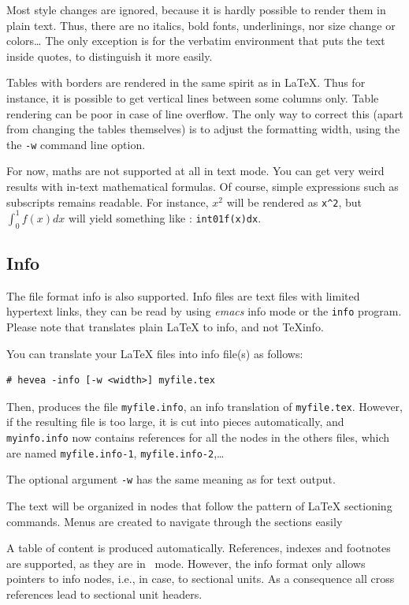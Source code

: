 Most style changes are ignored, because it is hardly
possible to render them in plain text. Thus, there are no italics,
bold fonts, underlinings, nor size change or colors\ldots{}
The only exception is for the verbatim environment
that puts the text inside quotes, to distinguish it more easily.

Tables with borders are rendered in the same spirit as in \LaTeX{}.
Thus for instance, it is possible to get vertical lines between some
columns only.
Table rendering can be poor in case of line overflow.
The only way to correct this (apart from changing the tables
themselves) is to adjust the formatting width, using the
the \texttt{-w} command line option.

For now, maths are not supported at all in text mode. You can get very weird
results with in-text mathematical formulas.
Of course, simple expressions such as subscripts remains readable.
For instance, $x^2$ will be rendered as \verb+x^2+, but $\int_0^1f(x)dx$ will
yield something like : \verb+int01f(x)dx+.


\subsection{Info}
The file format info is also supported.
Info files are text files with limited hypertext links, they
can be read by using \emph{emacs} info mode or the
\texttt{info} program.
Please note that \hevea{} translates plain \LaTeX{} to info, and not
TeXinfo.

You can translate your \LaTeX{} files into info file(s) as follows:
\begin{verbatim}
# hevea -info [-w <width>] myfile.tex
\end{verbatim}
Then, \hevea{} produces the file \texttt{myfile.info}, an info
translation of \texttt{myfile.tex}.
However, if the resulting  file is too large, it is cut into pieces
automatically,
and \texttt{myinfo.info} now contains references for all
the nodes in the others files, which are named \texttt{myfile.info-1},
\texttt{myfile.info-2},\ldots

The optional argument \verb+-w+ has the same meaning as for text output.

The text will be organized in nodes that follow
the pattern of \LaTeX{} sectioning
commands. Menus are created to navigate through the sections easily

A table of content is produced automatically.
References, indexes and footnotes are supported, as they are in
\html{}~mode.
However, the info format only allows pointers to info nodes,
i.e., in \hevea{} case, to sectional units.
As a consequence all cross references lead to sectional unit headers.


